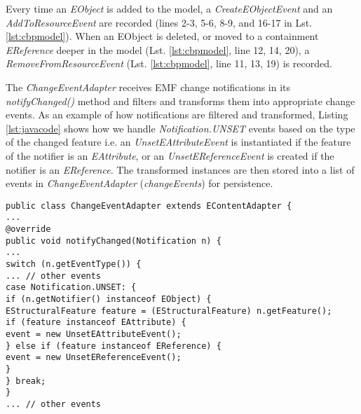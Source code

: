 

Every time an \emph{EObject} is added to the model, a \emph{CreateEObjectEvent} and an \emph{AddToResourceEvent} are recorded (lines 2-3, 5-6, 8-9, and 16-17 in Lst. \ref{lst:cbpmodel}). When an EObject is deleted, or moved to a containment \emph{EReference} deeper in the model (Lst. \ref{lst:cbpmodel}, line 12, 14, 20), a \emph{RemoveFromResourceEvent} (Lst. \ref{lst:cbpmodel}, line 11, 13, 19) is recorded.

The \emph{ChangeEventAdapter} receives EMF change notifications in its \emph{notifyChanged()} method and filters and transforms them into appropriate change events. As an example of how notifications are filtered and transformed, Listing \ref{lst:javacode} shows how we handle \emph{Notification.UNSET} events based on the type of the changed feature i.e. an \emph{UnsetEAttributeEvent} is instantiated if the feature of the notifier is an \emph{EAttribute}, or an \emph{UnsetEReferenceEvent}  is created if the notifier is an \emph{EReference}. The transformed instances are then stored into a list of events in \emph{ChangeEventAdapter} (\emph{changeEvents}) for persistence. 

\begin{lstlisting}[style=java,caption={Simplified Java code to handle notification events.},label=lst:javacode]
public class ChangeEventAdapter extends EContentAdapter {
...
@override
public void notifyChanged(Notification n) {
...
switch (n.getEventType()) {
... // other events
case Notification.UNSET: {
if (n.getNotifier() instanceof EObject) {
EStructuralFeature feature = (EStructuralFeature) n.getFeature();
if (feature instanceof EAttribute) {
event = new UnsetEAttributeEvent();
} else if (feature instanceof EReference) {
event = new UnsetEReferenceEvent();
}
} break;
} 
... // other events
\end{lstlisting}	

